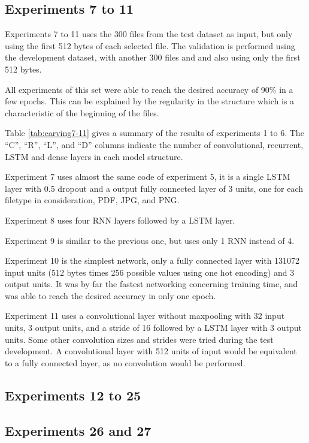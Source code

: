 \subsection{Experiments 7 to 11}
Experiments 7 to 11 uses the 300 files from the test dataset as input, but only using the first 512 bytes of each selected file. The validation is performed using the development dataset, with another 300 files and and also using only the first 512 bytes.

All experiments of this set were able to reach the desired accuracy of 90\% in a few epochs. This can be explained by the regularity in the structure which is a characteristic of the beginning of the files.

Table \ref{tab:carving7-11} gives a summary of the results of experiments 1 to 6. The ``C'', ``R'', ``L'', and ``D'' columns indicate the number of convolutional, recurrent, LSTM and dense layers in each model structure.


Experiment 7 uses almost the same code of experiment 5, it is a single LSTM layer with 0.5 dropout and a output fully connected layer of 3 units, one for each filetype in consideration, PDF, JPG, and PNG.

Experiment 8 uses four RNN layers followed by a LSTM layer.

Experiment 9 is similar to the previous one, but uses only 1 RNN instead of 4.

Experiment 10 is the simplest network, only a fully connected layer with 131072 input units (512 bytes times 256 possible values using one hot encoding) and 3 output units. It was by far the fastest networking concerning training time, and was able to reach the desired accuracy in only one epoch.

Experiment 11 uses a convolutional layer without maxpooling with 32 input units, 3 output units, and a stride of 16 followed by a LSTM layer with 3 output units. Some other convolution sizes and strides were tried during the test development. A convolutional layer with 512 units of input would be equivalent to a fully connected layer, as no convolution would be performed.

\subsection{Experiments 12 to 25}
\subsection{Experiments 26 and 27}



